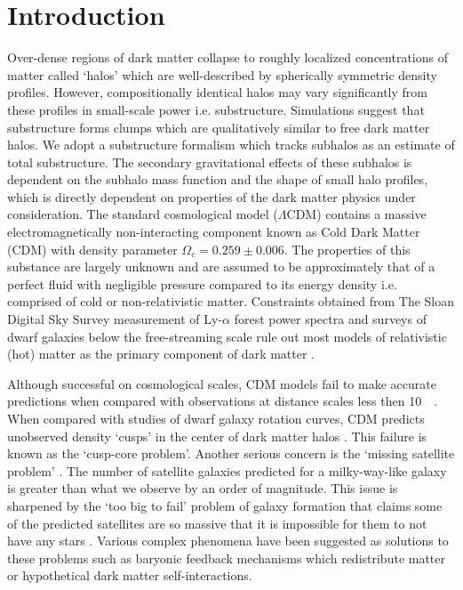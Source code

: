 \documentclass[usenatbib]{mnras}
\newcommand{\squote}[1]{\lq #1\rq}
\newcommand{\lcdm}{$\Lambda$CDM}
\begin{document}
\section{Introduction}
	Over-dense regions of dark matter collapse to roughly localized concentrations of matter called ‘halos’ which are well-described by spherically symmetric density profiles. However, compositionally identical halos may vary significantly from these profiles in small-scale power i.e. substructure. Simulations suggest that substructure forms clumps which are qualitatively similar to free dark matter halos. We adopt a substructure formalism which tracks subhalos as an estimate of total substructure. The secondary gravitational effects of these subhalos is dependent on the subhalo mass function and the shape of small halo profiles, which is directly dependent on properties of the dark matter physics under consideration.                
        The standard cosmological model (\lcdm) contains a massive electromagnetically non-interacting component known as Cold Dark Matter (CDM) with density parameter $\Omega_c = 0.259 \pm 0.006$. The properties of this substance are largely unknown and are assumed to be approximately that of a perfect fluid with negligible pressure compared to its energy density i.e. comprised of cold or non-relativistic matter. Constraints obtained from The Sloan Digital Sky Survey measurement of Ly-$\alpha$ forest power spectra and surveys of dwarf galaxies below the free-streaming scale rule out most models of relativistic (hot) matter as the primary component of dark matter \citep{can_neutrinos}. 
\par
        Although successful on cosmological scales, CDM models fail to make accurate predictions when compared with observations at distance scales less then \SI{10}{\kilo\parsec}. When compared with studies of dwarf galaxy rotation curves, CDM predicts unobserved density \squote{cusps} in the center of dark matter halos \citep{ultralight}. This failure is known as the \squote{cusp-core problem}. Another serious concern is the \squote{missing satellite problem}  \citep{missing_satellites}. The number of satellite galaxies predicted for a milky-way-like galaxy is greater than what we observe by an order of magnitude. This issue is sharpened by the \squote{too big to fail} problem of galaxy formation that claims some of the predicted satellites are so massive that it is impossible for them to not have any stars \citep{too_big_to_fail}. Various complex phenomena have been suggested as solutions to these problems such as baryonic feedback mechanisms which redistribute matter or  hypothetical dark matter self-interactions.
\end{document}
